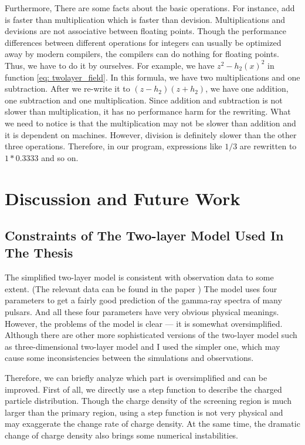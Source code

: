 \documentclass[12pt]{report}
\begin{document}
          Furthermore, There are some facts about the basic operations. For instance, add is faster than 
          multiplication which is faster than devision. Multiplications and devisions are not associative
          between floating points. 
          Though the performance differences between different operations for integers can usually be 
          optimized 
          away by modern compilers, the compilers can do nothing for floating points. Thus, we have to do 
          it 
          by ourselves. For example, we have $z^2 - h_2\left(x\right)^2$ in function 
          \ref{eq: twolayer_field}.
          In this formula, we have two multiplications and one subtraction. After we re-write it to 
          $\left(z-h_2\right)\left(z + h_2\right)$, we have one addition, one subtraction and one 
          multiplication.
          Since addition and subtraction is not slower than multiplication, it has no performance harm 
          for the rewriting. What we need to notice is that the multiplication may not be slower than 
          addition
          and it is dependent on machines. However, division is definitely slower than the other three operations. 
          Therefore, in our program, expressions like $1 / 3$ are rewritten to $1*0.3333$ and so on.  

    \chapter{Discussion and Future Work}
      \section{Constraints of The Two-layer Model Used In The Thesis} 
        The simplified two-layer model is consistent with observation data to some extent. 
        (The relevant data can be found in the paper \cite{0004-637X-720-1-178})
        The model uses four parameters to get a fairly good prediction of the gamma-ray 
        spectra of many pulsars. And all these four parameters have very obvious physical 
        meanings. However, the problems of the model is clear --- it is somewhat 
        oversimplified. Although there are other more sophisticated versions of the 
        two-layer model such as three-dimensional two-layer model 
        \cite{doi:10.1111/j.1365-2966.2011.18577.x} and I used the simpler one, which may cause 
        some inconsistencies between the simulations and observations. 

        Therefore, we can briefly analyze which part is oversimplified and can be improved. 
        First of all, we directly use a step function to describe the charged particle 
        distribution. Though the charge density of the screening region is much larger than 
        the primary region, using a step function is not very physical and may exaggerate 
        the change rate of charge density. At the same time, the dramatic change of charge 
        density also brings some numerical instabilities.
\end{document}
